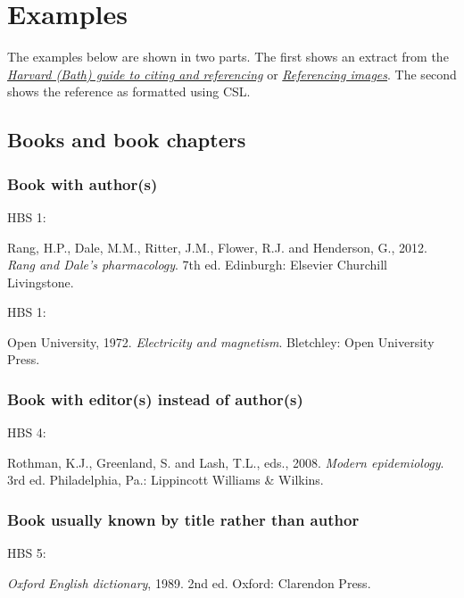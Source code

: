 \section{Examples}

The examples below are shown in two parts.
The first shows an extract from the
\href{https://library.bath.ac.uk/referencing/harvard-bath}{\emph{Harvard (Bath) guide to citing and referencing}} or
\href{http://www.bath.ac.uk/library/pass.bho/images-referencing.pdf}{\emph{Referencing images}}.
The second shows the reference as formatted using CSL.

\subsection{Books and book chapters}

\subsubsection*{Book with author(s)}

HBS 1: \cite{rang.etal2012rdp}

Rang, H.P., Dale, M.M., Ritter, J.M., Flower, R.J. and Henderson, G., 2012. \emph{Rang and Dale's pharmacology}. 7th ed. Edinburgh: Elsevier Churchill Livingstone.


HBS 1: \cite{ou1972em}

Open University, 1972. \emph{Electricity and magnetism}. Bletchley: Open University Press.



\subsubsection*{Book with editor(s) instead of author(s)}

HBS 4: \cite{rothman.etal2008me}

Rothman, K.J., Greenland, S. and Lash, T.L., eds., 2008. \emph{Modern epidemiology}. 3rd ed. Philadelphia, Pa.: Lippincott Williams \& Wilkins.



\subsubsection*{Book usually known by title rather than author}

HBS 5: \cite{oed1989}

\emph{Oxford English dictionary}, 1989. 2nd ed. Oxford: Clarendon Press.


